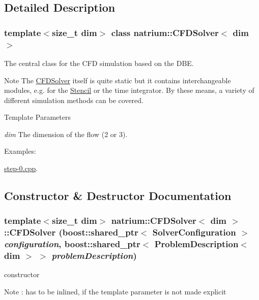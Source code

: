 \subsection{Detailed Description}
\subsubsection*{template$<$size\_\-t dim$>$ class natrium::CFDSolver$<$ dim $>$}

The central class for the CFD simulation based on the DBE. \begin{DoxyNote}{Note}
The \hyperlink{classnatrium_1_1CFDSolver}{CFDSolver} itself is quite static but it contains interchangeable modules, e.g. for the \hyperlink{classnatrium_1_1Stencil}{Stencil} or the time integrator. By these means, a variety of different simulation methods can be covered. 
\end{DoxyNote}

\begin{DoxyTemplParams}{Template Parameters}
\item[{\em dim}]The dimension of the flow (2 or 3). \end{DoxyTemplParams}
\begin{Desc}
\item[Examples: ]\par


\hyperlink{step-0_8cpp-example}{step-\/0.cpp}.\end{Desc}


\subsection{Constructor \& Destructor Documentation}
\hypertarget{classnatrium_1_1CFDSolver_a47ca594a73dc5ab04e319ba588cda3dd}{
\subsubsection[{CFDSolver}]{\setlength{\rightskip}{0pt plus 5cm}template$<$size\_\-t dim$>$ {\bf natrium::CFDSolver}$<$ dim $>$::{\bf CFDSolver} (boost::shared\_\-ptr$<$ {\bf SolverConfiguration} $>$ {\em configuration}, \/  boost::shared\_\-ptr$<$ {\bf ProblemDescription}$<$ dim $>$ $>$ {\em problemDescription})}}
\label{classnatrium_1_1CFDSolver_a47ca594a73dc5ab04e319ba588cda3dd}
constructor \begin{DoxyNote}{Note}
: has to be inlined, if the template parameter is not made explicit 
\end{DoxyNote}


